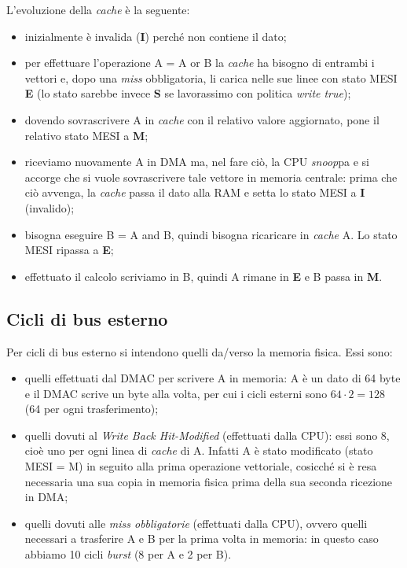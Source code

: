 L'evoluzione della \textit{cache} è la seguente:
\begin{itemize}
\item inizialmente è invalida (\textbf{I}) perché non contiene il dato;
\item per effettuare l'operazione A = A or B la \textit{cache} ha bisogno di entrambi i vettori e, dopo una \textit{miss} obbligatoria, li carica nelle sue linee con stato MESI \textbf{E} (lo stato sarebbe invece \textbf{S} se lavorassimo con politica \textit{write true});
\item dovendo sovrascrivere A in \textit{cache} con il relativo valore aggiornato, pone il relativo stato MESI a \textbf{M};
\item riceviamo nuovamente A in DMA ma, nel fare ciò, la CPU \textit{snoop}pa e si accorge che si vuole sovrascrivere tale vettore in memoria centrale: prima che ciò avvenga, la \textit{cache} passa il dato alla RAM e setta lo stato MESI a \textbf{I} (invalido);
\item bisogna eseguire B = A and B, quindi bisogna ricaricare in \textit{cache} A. Lo stato MESI ripassa a \textbf{E};
\item effettuato il calcolo scriviamo in B, quindi A rimane in \textbf{E} e B passa in \textbf{M}.
\end{itemize}

\subsection{Cicli di bus esterno}

Per cicli di bus esterno si intendono quelli da/verso la memoria fisica.
Essi sono:
\begin{itemize}
\item quelli effettuati dal DMAC per scrivere A in memoria: A è un dato di 64 byte e il DMAC scrive un byte alla volta, per cui i cicli esterni sono $64\cdot 2 = 128$ (64 per ogni trasferimento);
\item quelli dovuti al \textit{Write Back Hit-Modified} (effettuati dalla CPU): essi sono 8, cioè uno per ogni linea di \textit{cache} di A. Infatti A è stato modificato (stato MESI = M) in seguito alla prima operazione vettoriale, cosicché si è resa necessaria una sua copia in memoria fisica prima della sua seconda ricezione in DMA;
\item quelli dovuti alle \textit{miss obbligatorie} (effettuati dalla CPU), ovvero quelli necessari a trasferire A e B per la prima volta in memoria: in questo caso abbiamo 10 cicli \textit{burst} (8 per A e 2 per B).
\end{itemize}

